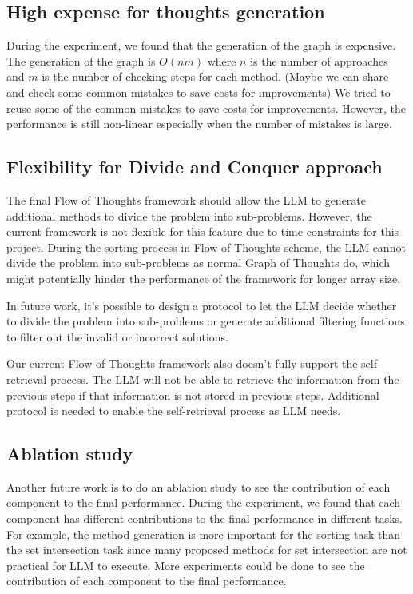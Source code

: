 \documentclass{article}
\begin{document}
\subsection{High expense for thoughts generation}

During the experiment, we found that the generation of the graph is expensive. The generation of the graph is $O(nm)$ where $n$ is the number of approaches and $m$ is the number of checking steps for each method. (Maybe we can share and check some common mistakes to save costs for improvements) We tried to reuse some of the common mistakes to save costs for improvements. However, the performance is still non-linear especially when the number of mistakes is large.

\subsection{Flexibility for Divide and Conquer approach}

The final Flow of Thoughts framework should allow the LLM to generate additional methods to divide the problem into sub-problems. However, the current framework is not flexible for this feature due to time constraints for this project. During the sorting process in Flow of Thoughts scheme, the LLM cannot divide the problem into sub-problems as normal Graph of Thoughts do, which might potentially hinder the performance of the framework for longer array size.

In future work, it's possible to design a protocol to let the LLM decide whether to divide the problem into sub-problems or generate additional filtering functions to filter out the invalid or incorrect solutions.

Our current Flow of Thoughts framework also doesn't fully support the self-retrieval process. The LLM will not be able to retrieve the information from the previous steps if that information is not stored in previous steps. Additional protocol is needed to enable the self-retrieval process as LLM needs.

\subsection{Ablation study}

Another future work is to do an ablation study to see the contribution of each component to the final performance. During the experiment, we found that each component has different contributions to the final performance in different tasks. For example, the method generation is more important for the sorting task than the set intersection task since many proposed methods for set intersection are not practical for LLM to execute. More experiments could be done to see the contribution of each component to the final performance.
\end{document}
